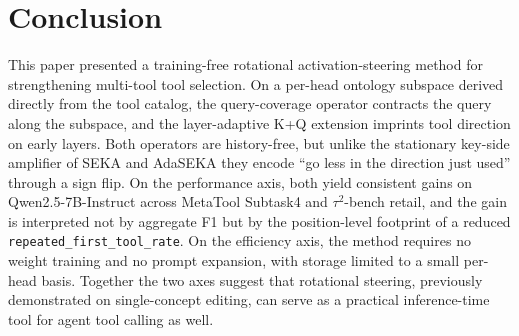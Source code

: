 \section{Conclusion}

This paper presented a training-free rotational activation-steering method for strengthening multi-tool tool selection. On a per-head ontology subspace derived directly from the tool catalog, the query-coverage operator contracts the query along the subspace, and the layer-adaptive K+Q extension imprints tool direction on early layers. Both operators are history-free, but unlike the stationary key-side amplifier of SEKA and AdaSEKA they encode ``go less in the direction just used'' through a sign flip. On the performance axis, both yield consistent gains on Qwen2.5-7B-Instruct across MetaTool Subtask4 and $\tau^2$-bench retail, and the gain is interpreted not by aggregate F1 but by the position-level footprint of a reduced \texttt{repeated\_first\_tool\_rate}. On the efficiency axis, the method requires no weight training and no prompt expansion, with storage limited to a small per-head basis. Together the two axes suggest that rotational steering, previously demonstrated on single-concept editing, can serve as a practical inference-time tool for agent tool calling as well.
